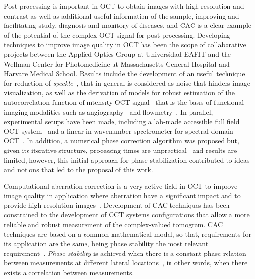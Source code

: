 Post-processing is important in OCT to obtain images with high resolution and contrast as well as additional useful information of the sample, improving and facilitating study, diagnosis and monitory of diseases, and CAC is a clear example of the potential of the complex OCT signal for post-processing. Developing techniques to improve image quality in OCT has been the scope of collaborative projects between the Applied Optics Group at Universidad EAFIT and the Wellman Center for Photomedicine at Massachusetts General Hospital and Harvare Medical School. Results include the development of an useful technique for reduction of \textit{speckle}~\cite{Cuartas-Velez2018_Volumetric}, that in general is considered as noise that hinders image visualization, as well as the derivation of models for robust estimation of the autocorrelation function of intensity OCT signal~\cite{Uribe-Patarroyo2020_noise} that is the basis of functional imaging modalities such as angiography~\cite{Wang2007_Three} and flowmetry~\cite{Liu2013_Quantitative}. In parallel, experimental setups have been made, including a lab-made accessible full field OCT system~\cite{Cuartas-Velez2019_Labmade} and a linear-in-wavenumber spectrometer for spectral-domain OCT~\cite{Ruiz-Lopera2018_Design}. In addition, a numerical phase correction algorithm was proposed but, given its iterative structure, processing times are unpractical~\cite{Cuartas-Velez2017_Formacion} and results are limited, however, this initial approach for phase stabilization contributed to ideas and notions that led to the proposal of this work. 

Computational aberration correction is a very active field in OCT to improve image quality in application where aberration have a significant impact and to provide high-resolution images~\cite{Adie2012_Computational, Hillmann2016_Aberrationfree, Kumar2017_Invivo}. Development of CAC techniques has been constrained to the development of OCT systems configurations that allow a more reliable and robust measurement of the complex-valued tomogram. CAC techniques are based on a common mathematical model, so that, requirements for its application are the same, being phase stability the most relevant requirement~\cite{Shemonski2014_Stability}. \textit{Phase stability} is achieved when there is a constant phase relation between measurements at different lateral locations~\cite{Shemonski2014_Stability}, in other words, when there exists a correlation between measurements.

